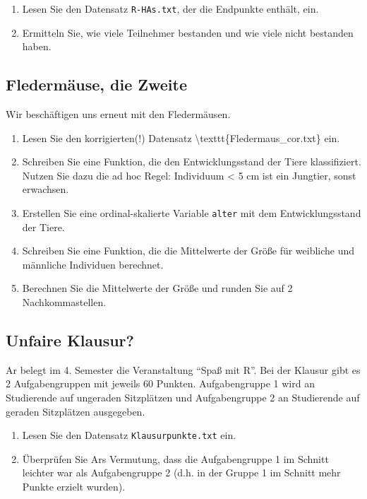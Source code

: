 \documentclass[]{book}
\providecommand{\tightlist}{%
  \setlength{\itemsep}{0pt}\setlength{\parskip}{0pt}}
\begin{document}
\begin{enumerate}
\def\labelenumi{\arabic{enumi}.}
\tightlist
\item
  Lesen Sie den Datensatz \texttt{R-HAs.txt}, der die Endpunkte enthält, ein.
\item
  Ermitteln Sie, wie viele Teilnehmer bestanden und wie viele nicht bestanden haben.
\end{enumerate}

\hypertarget{fledermuxe4use-die-zweite}{%
\subsection{Fledermäuse, die Zweite}\label{fledermuxe4use-die-zweite}}

Wir beschäftigen uns erneut mit den Fledermäusen.

\begin{enumerate}
\def\labelenumi{\arabic{enumi}.}
\tightlist
\item
  Lesen Sie den korrigierten(!) Datensatz \textbackslash{}texttt\{Fledermaus\_cor.txt\} ein.
\item
  Schreiben Sie eine Funktion, die den Entwicklungsstand der Tiere klassifiziert. Nutzen Sie dazu die ad hoc Regel: Individuum \textless{} 5 cm ist ein Jungtier, sonst erwachsen.
\item
  Erstellen Sie eine ordinal-skalierte Variable \texttt{alter} mit dem Entwicklungsstand der Tiere.
\item
  Schreiben Sie eine Funktion, die die Mittelwerte der Größe für weibliche und männliche Individuen berechnet.
\item
  Berechnen Sie die Mittelwerte der Größe und runden Sie auf 2 Nachkommastellen.
\end{enumerate}

\hypertarget{unfaire-klausur}{%
\subsection{Unfaire Klausur?}\label{unfaire-klausur}}

Ar belegt im 4. Semester die Veranstaltung ``Spaß mit R''. Bei der Klausur gibt es 2 Aufgabengruppen mit jeweils 60 Punkten. Aufgabengruppe 1 wird an Studierende auf ungeraden Sitzplätzen und Aufgabengruppe 2 an Studierende auf geraden Sitzplätzen ausgegeben.

\begin{enumerate}
\def\labelenumi{\arabic{enumi}.}
\tightlist
\item
  Lesen Sie den Datensatz \texttt{Klausurpunkte.txt} ein.
\item
  Überprüfen Sie Ars Vermutung, dass die Aufgabengruppe 1 im Schnitt leichter war als Aufgabengruppe 2 (d.h. in der Gruppe 1 im Schnitt mehr Punkte erzielt wurden).
\end{enumerate}
\end{document}
